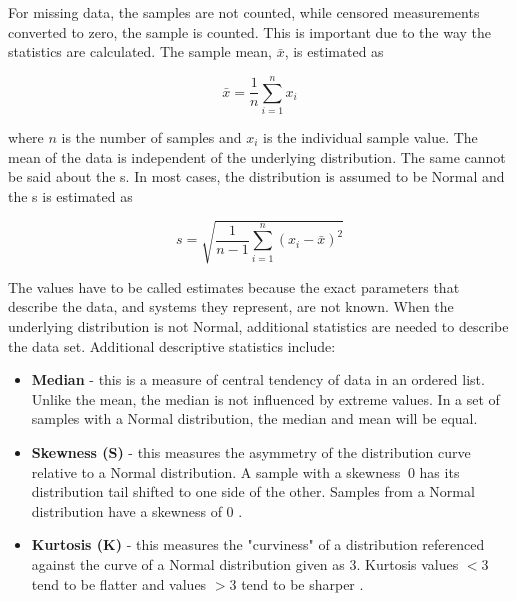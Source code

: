For missing data, the samples are not counted, while censored measurements converted to zero, the sample is counted. This is important due to the way the statistics are calculated. The sample mean, $\bar{x}$, is estimated as

\begin{equation}
\bar{x} = \frac{1}{n}\sum_{i = 1}^{n}x_{i}
\end{equation}

\noindent
where $n$ is the number of samples and $x_{i}$ is the individual sample value. The mean of the data is independent of the underlying distribution. The same cannot be said about the s. In most cases, the distribution is assumed to be Normal and the s is estimated as

\begin{equation}
s = \sqrt{\frac{1}{n-1}\sum_{i = 1}^{n}(x_{i}-\bar{x})^{2}}
\end{equation}

The values have to be called estimates because the exact parameters that describe the data, and systems they represent, are not known. When the underlying distribution is not Normal, additional statistics are needed to describe the data set.  Additional descriptive statistics include:

\begin{itemize}
\item \textbf{Median} - this is a measure of central tendency of data in an ordered list. Unlike the mean, the median is not influenced by extreme values. In a set of samples with a Normal distribution, the median and mean will be equal.
\item \textbf{Skewness (S)} - this measures the asymmetry of the distribution curve relative to a Normal distribution. A sample with a skewness $\>0$ has its distribution tail shifted to one side of the other. Samples from a Normal distribution have a skewness of 0 \citep{Cox2010, Cristelli2012}.
\item \textbf{Kurtosis (K)} - this measures the "curviness" of a distribution referenced against the curve of a Normal distribution given as 3. Kurtosis values $<$3 tend to be flatter and values $>$3 tend to be sharper \citep{Cox2010, Cristelli2012}.
\end{itemize} 

